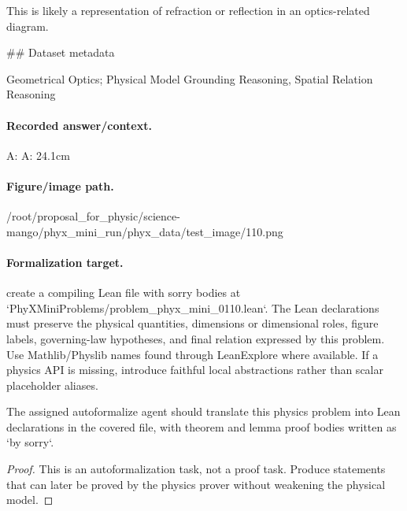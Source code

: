 This is likely a representation of refraction or reflection in an optics-related diagram.

\#\# Dataset metadata

Geometrical Optics; Physical Model Grounding Reasoning, Spatial Relation Reasoning

\paragraph{Recorded answer/context.}
A: A: 24.1cm

\paragraph{Figure/image path.}
/root/proposal\_for\_physic/science-mango/phyx\_mini\_run/phyx\_data/test\_image/110.png

\paragraph{Formalization target.}
create a compiling Lean file with sorry bodies at `PhyXMiniProblems/problem\_phyx\_mini\_0110.lean`. The Lean declarations must preserve the physical quantities, dimensions or dimensional roles, figure labels, governing-law hypotheses, and final relation expressed by this problem.
Use Mathlib/Physlib names found through LeanExplore where available. If a physics API is missing, introduce faithful local abstractions rather than scalar placeholder aliases.

\begin{theorem}
\label{thm:physics:phyx_mini_0110:target}
The assigned autoformalize agent should translate this physics problem into Lean declarations in the covered file, with theorem and lemma proof bodies written as `by sorry`.
\end{theorem}
\begin{proof}
This is an autoformalization task, not a proof task. Produce statements that can later be proved by the physics prover without weakening the physical model.
\end{proof}

